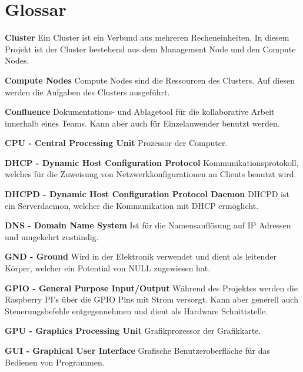 \section*{Glossar}
\textbf{Cluster}\newline
Ein Cluster ist ein Verbund aus mehreren Recheneinheiten. In diesem Projekt ist der Cluster bestehend aus dem Management Node und den Compute Nodes.

\textbf{Compute Nodes}\newline
Compute Nodes sind die Ressourcen des Clusters. Auf diesen werden die Aufgaben des Clusters ausgeführt.

\textbf{Confluence}\newline
Dokumentations- und Ablagetool für die kollaborative Arbeit innerhalb eines Teams. Kann aber auch für Einzelanwender benutzt werden. 

\textbf{CPU - Central Processing Unit}\newline
Prozessor der Computer.

\textbf{DHCP - Dynamic Host Configuration Protocol}\newline
Kommunikationsprotokoll, welches für die Zuweisung von Netzwerkkonfigurationen an Clients benutzt wird.

\textbf{DHCPD - Dynamic Host Configuration Protocol Daemon}\newline
DHCPD ist ein Serverdaemon, welcher die Kommunikation mit DHCP ermöglicht.

\textbf{DNS - Domain Name System}\newline
Ist für die Namensauflösung auf IP Adressen und umgekehrt zuständig.

\textbf{GND - Ground}\newline
Wird in der Elektronik verwendet und dient als leitender Körper, welcher ein Potential von NULL zugewiesen hat. 

\textbf{GPIO - General Purpose Input/Output}\newline
Während des Projektes werden die Raspberry PI's über die GPIO Pins mit Strom versorgt. Kann aber generell auch Steuerungsbefehle entgegennehmen und dient als Hardware Schnittstelle.

\textbf{GPU - Graphics Processing Unit}\newline
Grafikprozessor der Grafikkarte.

\textbf{GUI - Graphical User Interface}\newline
Grafische Benutzeroberfläche für das Bedienen von Programmen.

